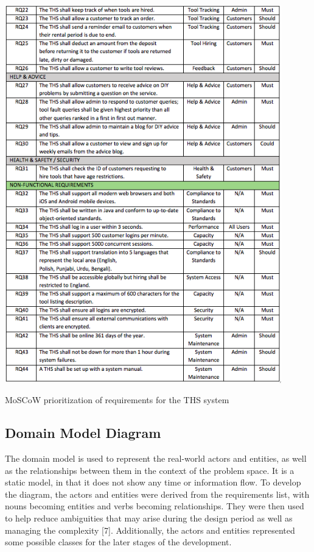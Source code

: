 \documentclass[fontsize=11pt]{extarticle}
\numberwithin{figure}{section} %
\numberwithin{table}{section}%
\begin{document}
\begin{table}[H]
      \centering
      \includegraphics[trim = 0 0 0 0, clip, width=0.9\textwidth]{TempImg/req2.png}
      \caption{MoSCoW prioritization of requirements for the THS system}
 \end{table}

\hypertarget{domain-model-diagram}{%
\subsection{Domain Model Diagram}\label{domain-model-diagram}}

The domain model is used to represent the real-world actors and
entities, as well as the relationships between them in the context of
the problem space. It is a static model, in that it does not show any
time or information flow. To develop the diagram, the actors and
entities were derived from the requirements list, with nouns becoming
entities and verbs becoming relationships. They were then used to help
reduce ambiguities that may arise during the design period as well as
managing the complexity {[}7{]}. Additionally, the actors and entities
represented some possible classes for the later stages of the
development.
\end{document}
